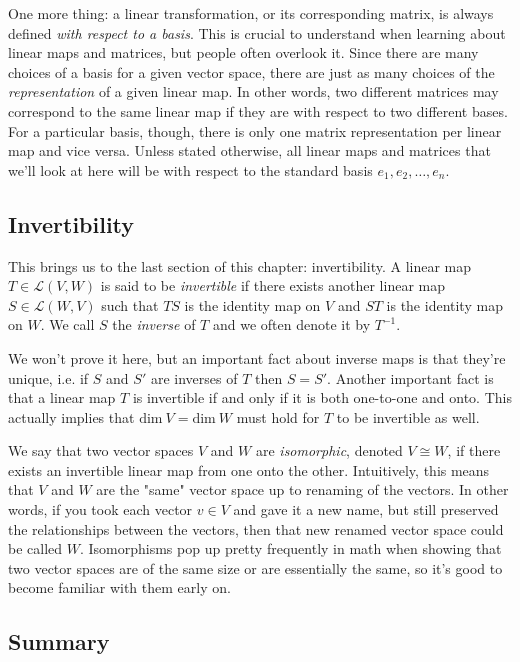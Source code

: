 \documentclass[12pt]{article}
\begin{document}
\vskip 3mm
One more thing:  a linear transformation, or its corresponding matrix, is always defined \textit{with respect to a basis}. This is crucial to understand when learning about linear maps and matrices, but people often overlook it. Since there are many choices of a basis for a given vector space, there are just as many choices of the \textit{representation} of a given linear map. In other words, two different matrices may correspond to the same linear map if they are with respect to two different bases. For a particular basis, though, there is only one matrix representation per linear map and vice versa. Unless stated otherwise, all linear maps and matrices that we'll look at here will be with respect to the standard basis $e_1, e_2, \ldots, e_n$.


\subsection*{Invertibility}

This brings us to the last section of this chapter:  invertibility. A linear map $T \in \mathcal{L}(V, W)$ is said to be \textit{invertible} if there exists another linear map $S \in \mathcal{L}(W, V)$ such that $TS$ is the identity map on $V$ and $ST$ is the identity map on $W$. We call $S$ the \textit{inverse} of $T$ and we often denote it by $T^{-1}$. 


We won't prove it here, but an important fact about inverse maps is that they're unique, i.e. if $S$ and $S'$ are inverses of $T$ then $S = S'$. Another important fact is that a linear map $T$ is invertible if and only if it is both one-to-one and onto. This actually implies that $\textrm{dim} \: V = \textrm{dim} \: W$ must hold for $T$ to be invertible as well.

We say that two vector spaces $V$ and $W$ are \textit{isomorphic}, denoted $V \cong W$, if there exists an invertible linear map from one onto the other. Intuitively, this means that $V$ and $W$ are the "same" vector space up to renaming of the vectors. In other words, if you took each vector $v \in V$ and gave it a new name, but still preserved the relationships between the vectors, then that new renamed vector space could be called $W$. Isomorphisms pop up pretty frequently in math when showing that two vector spaces are of the same size or are essentially the same, so it's good to become familiar with them early on.

\subsection*{Summary}
\end{document}
